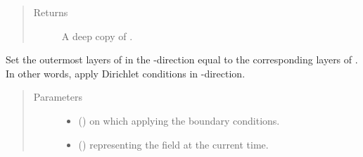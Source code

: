 \documentclass[letterpaper,10pt,english]{sphinxmanual}
\begin{document}
\begin{fulllineitems}
\begin{fulllineitems}
\begin{quote}
\begin{description}
\item[{Returns}] \leavevmode
A deep copy of .

\end{description}\end{quote}

\end{fulllineitems}


\begin{fulllineitems}
\label{\detokenize{api:dycore.horizontal_boundary.Relaxed.set_outermost_layers_x}}
Set the outermost layers of  in the -direction equal to the corresponding
layers of . In other words, apply Dirichlet conditions in -direction.
\begin{quote}\begin{description}
\item[{Parameters}] \leavevmode\begin{itemize}
\item {} 
 () \textendash{}  on which applying the boundary conditions.

\item {} 
 () \textendash{}  representing the field at the current time.

\end{itemize}

\end{description}\end{quote}

\end{fulllineitems}



\end{fulllineitems}
\end{document}
